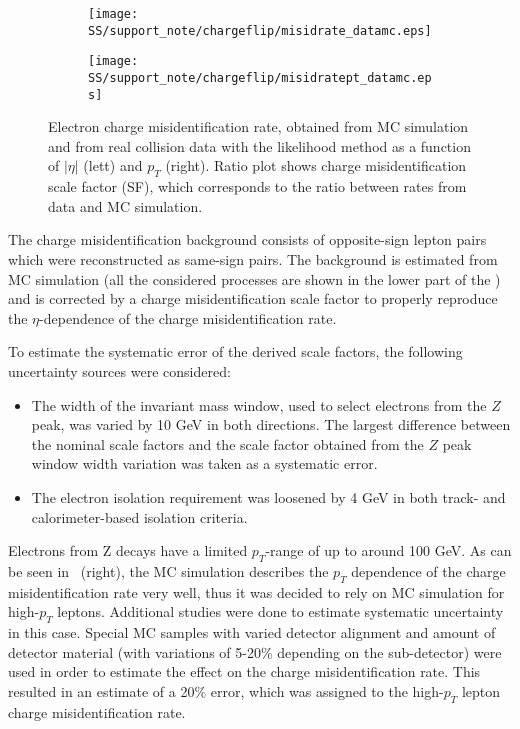 \begin{figure}
\begin{subfigure}{.5\textwidth}
  \centering
  \texttt{[image: SS/support\_note/chargeflip/misidrate\_datamc.eps]}
\end{subfigure}%
\begin{subfigure}{.5\textwidth}
  \centering
  \texttt{[image: SS/support\_note/chargeflip/misidratept\_datamc.eps]}
\end{subfigure}
\caption{Electron charge misidentification rate, obtained from MC simulation and from real collision data with the likelihood method as a function of $|\eta|$ (lett) and $p_T$ (right).
Ratio plot shows charge misidentification scale factor (SF), which corresponds to the ratio between rates from data and MC simulation.}
\label{fig:charge_flip_data_vs_mc}
\end{figure}

The charge misidentification background consists of opposite-sign lepton pairs which were reconstructed as same-sign pairs.
The background is estimated from MC simulation (all the considered processes are shown in the lower part of the ) 
and is corrected by a charge misidentification scale factor to properly reproduce the $\eta$-dependence of the charge misidentification rate.

To estimate the systematic error of the derived scale factors, the following uncertainty sources were considered:
\begin{itemize}
 \item The width of the invariant mass window, used to select electrons from the $Z$ peak, was varied by 10 GeV in both directions.
 The largest difference between the nominal scale factors and the scale factor obtained from the $Z$ peak window width variation was taken as a systematic error.
 \item The electron isolation requirement was loosened by 4 GeV in both track- and calorimeter-based isolation criteria.
\end{itemize}
Electrons from Z decays have a limited $p_T$-range of up to around 100 GeV. As can be seen in~ (right), 
the MC simulation describes the $p_T$ dependence of the charge misidentification rate very well, thus it was decided to rely on MC simulation 
for high-$p_T$ leptons. Additional studies were done to estimate systematic uncertainty in this case.
Special MC samples with varied detector alignment and amount of detector material (with variations of 5-20$\%$ depending on the sub-detector) 
were used in order to estimate the effect on the charge misidentification rate.
This resulted in an estimate of a 20$\%$ error, which was assigned to the high-$p_T$ lepton charge misidentification rate.

